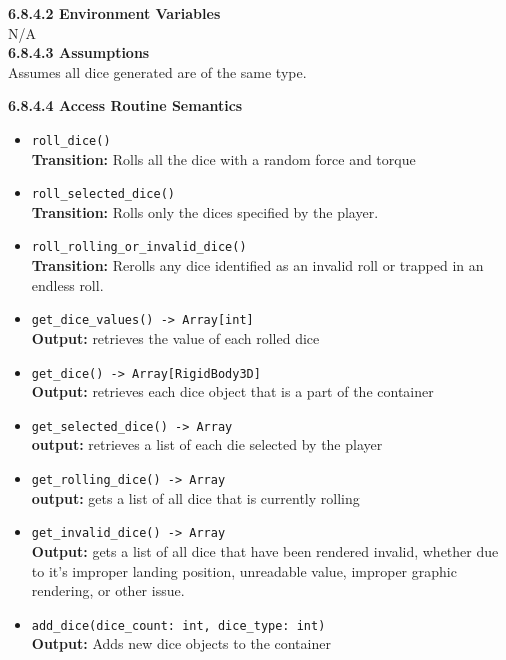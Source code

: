 \documentclass[12pt, titlepage]{article}
\begin{document}
\textbf{6.8.4.2 Environment Variables}\\

N/A\\

\textbf{6.8.4.3 Assumptions}\\
Assumes all dice generated are of the same type.

\textbf{6.8.4.4 Access Routine Semantics}
\begin{itemize}
	\item \texttt{roll\_dice() }\\
    	\textbf{Transition:} Rolls all the dice with a random force and torque
	
	\item \texttt{roll\_selected\_dice() }\\
	\textbf{Transition:} Rolls only the dices specified by the player. 
	
	\item \texttt{roll\_rolling\_or\_invalid\_dice() }\\
	\textbf{Transition:} Rerolls any dice identified as an invalid roll or trapped in an endless roll.
	
	\item \texttt{get\_dice\_values() -> Array[int]}\\
	\textbf{Output:} retrieves the value of each rolled dice
	
	\item \texttt{get\_dice() -> Array[RigidBody3D] }\\
	\textbf{Output:} retrieves each dice object that is a part of the container
	
	\item \texttt{get\_selected\_dice() -> Array }\\
	\textbf{output:} retrieves a list of each die selected by the player
	
	\item \texttt{get\_rolling\_dice() -> Array}\\
	\textbf{output:} gets a list of all dice that is currently rolling
	
	\item \texttt{get\_invalid\_dice() -> Array }\\
	\textbf{Output:} gets a list of all dice that have been rendered invalid, whether due to it's improper landing position, unreadable value, improper graphic rendering, or other issue.
	
	\item \texttt{add\_dice(dice\_count: int, dice\_type: int)}\\
	\textbf{Output:} Adds new dice objects to the container
	

\end{itemize}
\end{document}
